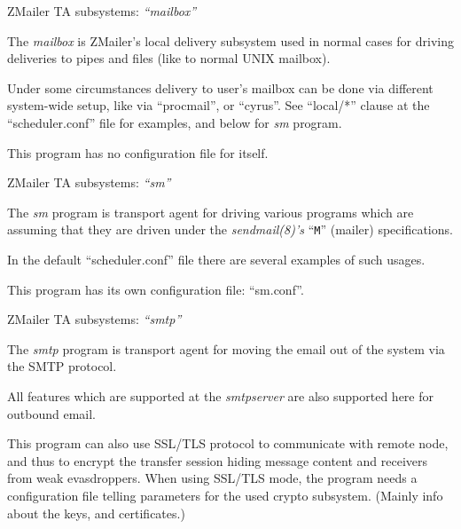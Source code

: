 \documentclass[a4paper,landscape]{slides}
\newcommand{\ZM}{ZMailer}
\begin{document}


\begin{slide}

\centerline{\large \ZM{} TA subsystems: {\it ``mailbox''}}

The {\it mailbox} is \ZM's local delivery subsystem used in
normal cases for driving deliveries to pipes and files (like
to normal UNIX mailbox).

Under some circumstances delivery to user's mailbox can be
done via different system-wide setup, like via ``procmail'', or ``cyrus''.
See ``local/*'' clause at the ``scheduler.conf'' file for examples,
and below for {\it sm} program.

This program has no configuration file for itself.

\vfill

\end{slide}



\begin{slide}

\centerline{\large \ZM{} TA subsystems: {\it ``sm''}}

The {\it sm} program is transport agent for driving various
programs which are assuming that they are driven under the
{\it sendmail(8)'s} ``\verb!M!'' (mailer) specifications.

In the default ``scheduler.conf'' file there are several
examples of such usages.

This program has its own configuration file: ``sm.conf''.

\vfill

\end{slide}



\begin{slide}

\centerline{\large \ZM{} TA subsystems: {\it ``smtp''}}

The {\it smtp} program is transport agent for moving the email
out of the system via the SMTP protocol.

All features which are supported at the {\it smtpserver} are
also supported here for outbound email.

This program can also use SSL/TLS protocol to communicate with
remote node, and thus to encrypt the transfer session hiding
message content and receivers from weak evasdroppers.
When using SSL/TLS mode, the program needs a configuration file
telling parameters for the used crypto subsystem.
(Mainly info about the keys, and certificates.)

\vfill

\end{slide}
\end{document}
